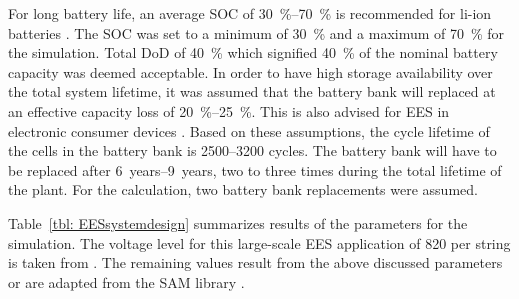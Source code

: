 For long battery life, an average \ac{SOC} of \SIrange{30}{70}{\percent} is recommended for \ac{li-ion} batteries \cite{Jossen2006}. The \ac{SOC} was set to a minimum of \SI{30}{\percent} and a maximum of \SI{70}{\percent} for the simulation. Total \ac{DoD} of \SI{40}{\percent} which signified \SI{40}{\percent} of the nominal battery capacity was deemed acceptable. In order to have high storage availability over the total system lifetime, it was assumed that the battery bank will replaced at an effective capacity loss of \SIrange{20}{25}{\percent}. This is also advised for \ac{EES} in electronic consumer devices \cite{Spotnitz2003}. Based on these assumptions, the cycle lifetime of the cells in the battery bank is \numrange{2500}{3200} cycles. The battery bank will have to be replaced after \SIrange{6}{9}{years}, two to three times during the total lifetime of the plant. For the calculation, two battery bank replacements were assumed. 


Table~\ref{tbl: EESsystemdesign} summarizes results of the parameters for the simulation. The voltage level for this large-scale \ac{EES} application of \SI{820}{\voltsdc} per string is taken from \cite{Leuthold2014}. The remaining values result from the above discussed parameters or are adapted from the \ac{SAM} library \cite{Diorio2015}.

